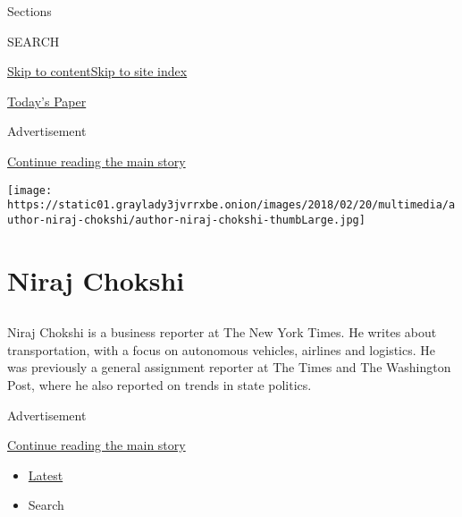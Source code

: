 Sections

SEARCH

\protect\hyperlink{site-content}{Skip to
content}\protect\hyperlink{site-index}{Skip to site index}

\href{https://myaccount.nytimes3xbfgragh.onion/auth/login?response_type=cookie\&client_id=vi}{}

\href{https://www.nytimes3xbfgragh.onion/section/todayspaper}{Today's
Paper}

Advertisement

\protect\hyperlink{after-top}{Continue reading the main story}

\texttt{[image: https://static01.graylady3jvrrxbe.onion/images/2018/02/20/multimedia/author-niraj-chokshi/author-niraj-chokshi-thumbLarge.jpg]}

\hypertarget{niraj-chokshi}{%
\section{Niraj Chokshi}\label{niraj-chokshi}}

\subsection{}

Niraj Chokshi is a business reporter at The New York Times. He writes
about transportation, with a focus on autonomous vehicles, airlines and
logistics. He was previously a general assignment reporter at The Times
and The Washington Post, where he also reported on trends in state
politics.

Advertisement

\protect\hyperlink{after-mid1}{Continue reading the main story}

\begin{itemize}
\tightlist
\item
  \protect\hyperlink{stream-panel}{Latest}
\item
  Search
\end{itemize}

